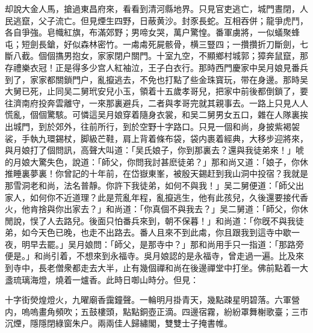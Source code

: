 却說大金人馬，搶過東昌府來，看看到清河縣地界。只見官吏逃亡，城門晝閉，人民逃竄，父子流亡。但見煙生四野，日蔽黄沙。封豕長蛇。互相吞併；龍爭虎鬥，各自爭強。皂幟紅旗，布滿郊野；男啼女哭，萬户驚惶。番軍虜將，一似蟻聚蜂屯；短劍長鎗，好似森林密竹。一䖏䖏死屍骸骨，横三豎四；一攢攢折刀斷劍，七斷八截。個個㩦男抱女，家家閉户關門。十室九空，不顯鄉村城郭；獐奔鼠竄，那存禮樂衣冠！正是得多少宫人紅袖泣，王子白衣行。那時西門慶家中吴月娘見番兵到了，家家都關鎖門户，亂攛逃去，不免也打點了些金珠寳玩，带在身邊。那時吴大舅已死，止同吴二舅玳安兒小玉，領着十五歲孝哥兒，把家中前後都倒鎖了，要往濟南府投奔雲離守，一來那裏避兵，二者與孝哥完就其親事去。一路上只見人人慌亂，個個驚駭。可憐這吴月娘穿着隨身衣裳，和吴二舅男女五口，雜在人隊裏挨出城門，到於郊外，往前所行，到於空野十字路口。只見一個和尚，身披紫褐袈裟，手執九環錫杖，脚級芒鞋，肩上背着條布袋，袋内裹着經典，大移步迎將來，與月娘打了個問訊，高聲大叫道：「吴氏娘子，你到那裏去？還與我徒弟來！」唬的月娘大驚失色，說道：「師父，你問我討甚麽徒弟？」那和尚又道：「娘子，你休推睡裏夢裏！你曾記的十年前，在岱嶽東峯，被殷天錫赶到我山洞中投宿？我就是那雪洞老和尚，法名普靜。你許下我徒弟，如何不與我！」吴二舅便道：「師父出家人，如何你不近道理？此是荒亂年程，亂攛逃生，他有此孩兒，久後還要接代香火，他肯捨與你出家去？」和尚道：「你真個不與我去？」吴二舅道：「師父，你休閒說，悮了人去路兒。後面只怕番兵來到，朝不保暮！」和尚道：「你旣不與我徒弟，如今天色已晚，也走不出路去。番人且來不到此䖏，你且跟我到這寺中歇一夜，明早去罷。」吴月娘問：「師父，是那寺中？」那和尚用手只一指道：「那路旁便是。」和尚引着，不想來到永福寺。吳月娘認的是永福寺，曾走過一遍。比及來到寺中，長老僧衆都走去大半，止有幾個禪和尚在後邊禪堂中打坐。佛前點着一大盞琉璃海燈，燒着一爐香。此時日啣山時分。但見：
\begin{myquote}
十字街熒煌燈火，九曜廟香靄鐘聲。一輪明月掛青天，幾點疎星明碧落。六軍營内，嗚嗚畫角頻吹；五鼓樓頭，點點銅壺正滴。四邊宿霧，紛紛罩舞榭歌臺；三市沉煙，隱隱閉綠窗朱户。兩兩佳人歸繡閣，雙雙士子掩書帷。
\end{myquote}

